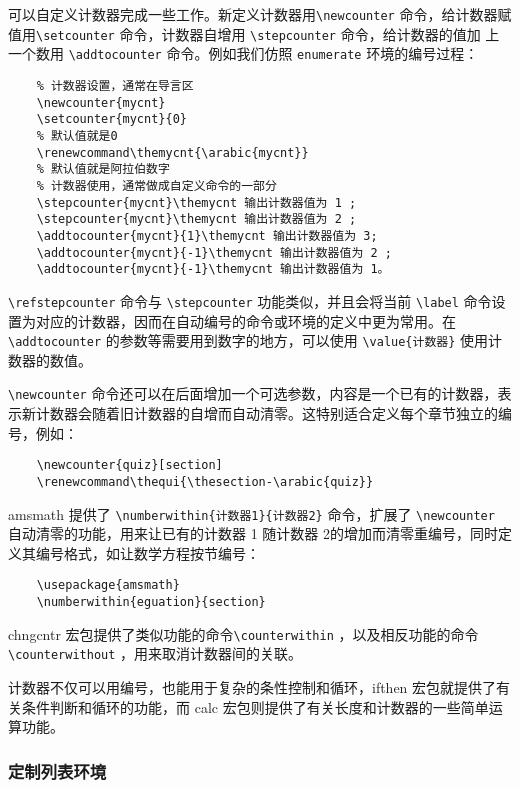 可以自定义计数器完成一些工作。新定义计数器用\verb|\newcounter| 命令，给计数器赋值用\verb|\setcounter| 命令，计数器自增用 \verb|\stepcounter| 命令，给计数器的值加
上一个数用 \verb|\addtocounter| 命令。例如我们仿照 \verb|enumerate| 环境的编号过程：

\begin{lstlisting}
    % 计数器设置，通常在导言区
    \newcounter{mycnt}
    \setcounter{mycnt}{0}
    % 默认值就是0
    \renewcommand\themycnt{\arabic{mycnt}}
    % 默认值就是阿拉伯数字
    % 计数器使用，通常做成自定义命令的一部分
    \stepcounter{mycnt}\themycnt 输出计数器值为 1 ;
    \stepcounter{mycnt}\themycnt 输出计数器值为 2 ;
    \addtocounter{mycnt}{1}\themycnt 输出计数器值为 3;
    \addtocounter{mycnt}{-1}\themycnt 输出计数器值为 2 ;
    \addtocounter{mycnt}{-1}\themycnt 输出计数器值为 1。
\end{lstlisting}

\verb|\refstepcounter| 命令与 \verb|\stepcounter| 功能类似，并且会将当前 \verb|\label| 命令设置为对应的计数器，因而在自动编号的命令或环境的定义中更为常用。在 \verb|\addtocounter| 的参数等需要用到数字的地方，可以使用 \verb|\value{计数器}| 使用计数器的数值。

\verb|\newcounter| 命令还可以在后面增加一个可选参数，内容是一个已有的计数器，表示新计数器会随着旧计数器的自增而自动清零。这特别适合定义每个章节独立的编号，例如：

\begin{lstlisting}
    \newcounter{quiz}[section]
    \renewcommand\thequi{\thesection-\arabic{quiz}}
\end{lstlisting}

amsmath 提供了 \verb|\numberwithin{计数器1}{计数器2}| 命令，扩展了 \verb|\newcounter|
自动清零的功能，用来让已有的计数器 1 随计数器 2的增加而清零重编号，同时定义其编号格式，如让数学方程按节编号：

\begin{lstlisting}
    \usepackage{amsmath}
    \numberwithin{eguation}{section}
\end{lstlisting}

chngcntr 宏包提供了类似功能的命令\verb|\counterwithin| ，以及相反功能的命令
\verb|\counterwithout| ，用来取消计数器间的关联。

计数器不仅可以用编号，也能用于复杂的条性控制和循环，ifthen 宏包就提供了有关条件判断和循环的功能，而 calc 宏包则提供了有关长度和计数器的一些简单运算功能。

\subsubsection{定制列表环境}

